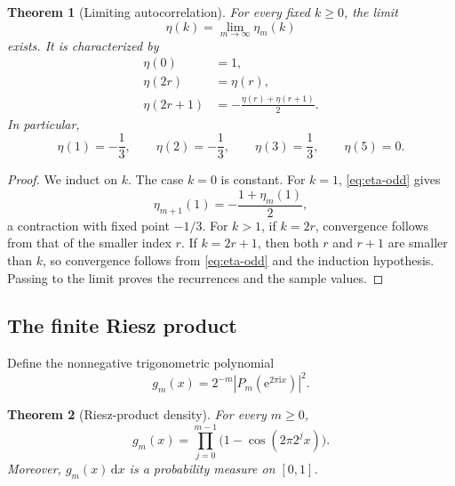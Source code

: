 \documentclass[11pt,oneside]{article}
\newtheorem{theorem}{Theorem}[section]
\theoremstyle{definition}
\theoremstyle{remark}
\newcommand{\e}{\mathrm e}
\newcommand{\ii}{\mathrm i}
\newcommand{\dd}{\,\mathrm d}
\newcommand{\1}{\mathbf 1}
\begin{document}
\begin{theorem}[Limiting autocorrelation]
\label{thm:limiting-correlation}
For every fixed \(k\ge0\), the limit
\begin{equation}
 \eta(k)=\lim_{m\to\infty}\eta_m(k)
 \label{eq:eta-limit}
\end{equation}
exists.  It is characterized by
\begin{align}
 \eta(0)&=1,                                                  \label{eq:eta0}\\
 \eta(2r)&=\eta(r),                                           \label{eq:eta-limit-even}\\
 \eta(2r+1)&=-\frac{\eta(r)+\eta(r+1)}2.                     \label{eq:eta-limit-odd}
\end{align}
In particular,
\begin{equation}
 \eta(1)=-\frac13,
 \qquad
 \eta(2)=-\frac13,
 \qquad
 \eta(3)=\frac13,
 \qquad
 \eta(5)=0.
 \label{eq:eta-examples}
\end{equation}
\end{theorem}

\begin{proof}
We induct on \(k\).  The case \(k=0\) is constant.  For \(k=1\),
\eqref{eq:eta-odd} gives
\[
 \eta_{m+1}(1)=-\frac{1+\eta_m(1)}2,
\]
a contraction with fixed point \(-1/3\).  For \(k>1\), if \(k=2r\), convergence follows from
that of the smaller index \(r\).  If \(k=2r+1\), then both \(r\) and \(r+1\) are smaller than
\(k\), so convergence follows from \eqref{eq:eta-odd} and the induction hypothesis.  Passing
to the limit proves the recurrences and the sample values.
\end{proof}

\subsection{The finite Riesz product}

Define the nonnegative trigonometric polynomial
\begin{equation}
 g_m(x)=2^{-m}\left|P_m(\e^{2\pi\ii x})\right|^2.
 \label{eq:gm-def}
\end{equation}

\begin{theorem}[Riesz-product density]
\label{thm:riesz-finite}
For every \(m\ge0\),
\begin{equation}
 \boxed{
 g_m(x)=\prod_{j=0}^{m-1}\bigl(1-\cos(2\pi2^jx)\bigr).}
 \label{eq:riesz-product}
\end{equation}
Moreover, \(g_m(x)\dd x\) is a probability measure on \([0,1]\).
\end{theorem}
\end{document}
